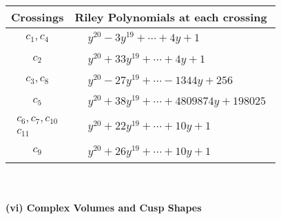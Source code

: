\documentclass[1p]{elsarticle_modified}
\theoremstyle{definition}
\begin{document}
\begin{tabular}{m{50pt}|m{274pt}}
Crossings & \hspace{64pt}Riley Polynomials at each crossing \\
\hline $$\begin{aligned}c_{1},c_{4}\end{aligned}$$&$\begin{aligned}
&y^{20}-3 y^{19}+\cdots+4 y+1
\end{aligned}$\\
\hline $$\begin{aligned}c_{2}\end{aligned}$$&$\begin{aligned}
&y^{20}+33 y^{19}+\cdots+4 y+1
\end{aligned}$\\
\hline $$\begin{aligned}c_{3},c_{8}\end{aligned}$$&$\begin{aligned}
&y^{20}-27 y^{19}+\cdots-1344 y+256
\end{aligned}$\\
\hline $$\begin{aligned}c_{5}\end{aligned}$$&$\begin{aligned}
&y^{20}+38 y^{19}+\cdots+4809874 y+198025
\end{aligned}$\\
\hline $$\begin{aligned}c_{6},c_{7},c_{10}\\c_{11}\end{aligned}$$&$\begin{aligned}
&y^{20}+22 y^{19}+\cdots+10 y+1
\end{aligned}$\\
\hline $$\begin{aligned}c_{9}\end{aligned}$$&$\begin{aligned}
&y^{20}+26 y^{19}+\cdots+10 y+1
\end{aligned}$\\
\hline
\end{tabular}\\~\\
\newpage\flushleft \textbf{(vi) Complex Volumes and Cusp Shapes}
\end{document}
